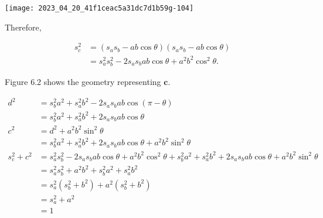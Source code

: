     \begin{center}
        \texttt{[image: 2023\_04\_20\_41f1ceac5a31dc7d1b59g-104]}
    \end{center}

    Therefore,

    $$
        \begin{aligned}
            s_{c}^{2} & =\left(s_{a} s_{b}-a b \cos \theta\right)\left(s_{a} s_{b}-a b \cos \theta\right) \\
                      & =s_{a}^{2} s_{b}^{2}-2 s_{a} s_{b} a b \cos \theta+a^{2} b^{2} \cos ^{2} \theta .
        \end{aligned}
    $$

    Figure 6.2 shows the geometry representing $\mathbf{c}$.

    $$
        \begin{aligned}
            d^{2}           & =s_{b}^{2} a^{2}+s_{a}^{2} b^{2}-2 s_{a} s_{b} a b \cos (\pi-\theta)                                                                                                       \\
                            & =s_{b}^{2} a^{2}+s_{a}^{2} b^{2}+2 s_{a} s_{b} a b \cos \theta                                                                                                             \\
            c^{2}           & =d^{2}+a^{2} b^{2} \sin ^{2} \theta                                                                                                                                        \\
                            & =s_{b}^{2} a^{2}+s_{a}^{2} b^{2}+2 s_{a} s_{b} a b \cos \theta+a^{2} b^{2} \sin ^{2} \theta                                                                                \\
            s_{c}^{2}+c^{2} & =s_{a}^{2} s_{b}^{2}-2 s_{a} s_{b} a b \cos \theta+a^{2} b^{2} \cos ^{2} \theta+s_{b}^{2} a^{2}+s_{a}^{2} b^{2}+2 s_{a} s_{b} a b \cos \theta+a^{2} b^{2} \sin ^{2} \theta \\
                            & =s_{a}^{2} s_{b}^{2}+a^{2} b^{2}+s_{b}^{2} a^{2}+s_{a}^{2} b^{2}                                                                                                           \\
                            & =s_{a}^{2}\left(s_{b}^{2}+b^{2}\right)+a^{2}\left(s_{b}^{2}+b^{2}\right)                                                                                                   \\
                            & =s_{a}^{2}+a^{2}                                                                                                                                                           \\
                            & =1
        \end{aligned}
    $$

